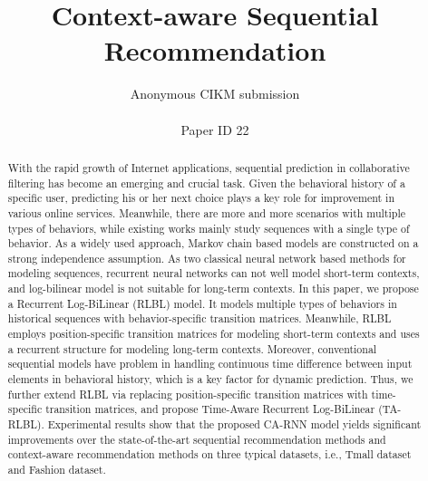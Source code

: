 \documentclass{sig-alternate}
\begin{document}
\title{Context-aware Sequential Recommendation}

\author{
        Anonymous CIKM submission\\
        \\
        Paper ID 22
       }
\maketitle


\begin{abstract}
With the rapid growth of Internet applications, sequential prediction in collaborative filtering has become an emerging and crucial task. Given the behavioral history of a specific user, predicting his or her next choice plays a key role for improvement in various online services. Meanwhile, there are more and more scenarios with multiple types of behaviors, while existing works mainly study sequences with a single type of behavior. As a widely used approach, Markov chain based models are constructed on a strong independence assumption. As two classical neural network based methods for modeling sequences, recurrent neural networks can not well model short-term contexts, and log-bilinear model is not suitable for long-term contexts. In this paper, we propose a Recurrent Log-BiLinear (RLBL) model. It models multiple types of behaviors in historical sequences with behavior-specific transition matrices. Meanwhile, RLBL employs position-specific transition matrices for modeling short-term contexts and uses a recurrent structure for modeling long-term contexts. Moreover, conventional sequential models have problem in handling continuous time difference between input elements in behavioral history, which is a key factor for dynamic prediction. Thus, we further extend RLBL via replacing position-specific transition matrices with time-specific transition matrices, and propose Time-Aware Recurrent Log-BiLinear (TA-RLBL). Experimental results show that the proposed CA-RNN model yields significant improvements over the state-of-the-art sequential recommendation methods and context-aware recommendation methods on three typical datasets, i.e., Tmall dataset and Fashion dataset.
\end{abstract}

\end{document}
